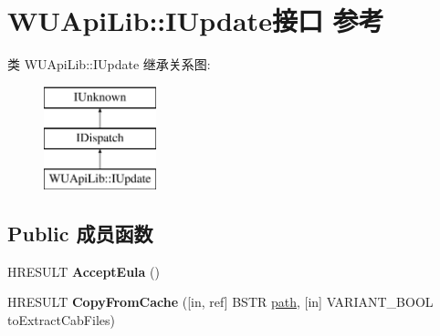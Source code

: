 \hypertarget{interface_w_u_api_lib_1_1_i_update}{}\section{W\+U\+Api\+Lib\+:\+:I\+Update接口 参考}
\label{interface_w_u_api_lib_1_1_i_update}
类 W\+U\+Api\+Lib\+:\+:I\+Update 继承关系图\+:\begin{figure}[H]
\begin{center}
\leavevmode
\includegraphics[height=3.000000cm]{interface_w_u_api_lib_1_1_i_update}
\end{center}
\end{figure}
\subsection*{Public 成员函数}
\begin{DoxyCompactItemize}
\item 
\mbox{\label{interface_w_u_api_lib_1_1_i_update_a11619ec28afeb8712d1572602669d4ce}} 
H\+R\+E\+S\+U\+LT {\bfseries Accept\+Eula} ()
\item 
\mbox{\label{interface_w_u_api_lib_1_1_i_update_af7e1b09c7316b37af70e438d0d58d907}} 
H\+R\+E\+S\+U\+LT {\bfseries Copy\+From\+Cache} (\mbox{[}in, ref\mbox{]} B\+S\+TR \hyperlink{structpath}{path}, \mbox{[}in\mbox{]} V\+A\+R\+I\+A\+N\+T\+\_\+\+B\+O\+OL to\+Extract\+Cab\+Files)
\end{DoxyCompactItemize}
